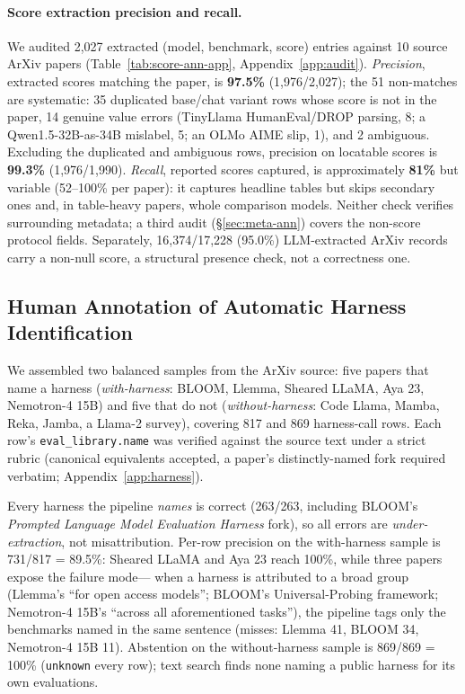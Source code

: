 \documentclass[11pt]{article}
\begin{document}
\paragraph{Score extraction precision and recall.}
We audited 2{,}027 extracted (model, benchmark, score) entries against 10 source
ArXiv papers (Table~\ref{tab:score-ann-app}, Appendix~\ref{app:audit}).
\emph{Precision}, extracted scores matching the paper, is \textbf{97.5\%}
(1{,}976/2{,}027); the 51 non-matches are systematic: 35 duplicated base/chat variant
rows whose score is not in the paper, 14 genuine value errors (TinyLlama
HumanEval/DROP parsing, 8; a Qwen1.5-32B-as-34B mislabel, 5; an OLMo AIME slip, 1),
and 2 ambiguous. Excluding the duplicated and ambiguous rows, precision on locatable
scores is \textbf{99.3\%} (1{,}976/1{,}990). \emph{Recall},
reported scores captured, is approximately \textbf{81\%} but variable (52--100\%
per paper): it captures headline tables but skips secondary ones and, in
table-heavy papers, whole comparison models. Neither check verifies surrounding
metadata; a third audit (\S\ref{sec:meta-ann}) covers the non-score protocol fields.
Separately, 16{,}374/17{,}228 (95.0\%) LLM-extracted ArXiv records carry a non-null
score, a structural presence check, not a correctness one.

\subsection{Human Annotation of Automatic Harness Identification}
\label{sec:harness-ann}
We assembled two balanced samples from the ArXiv source: five papers that name a
harness (\emph{with-harness}: BLOOM, Llemma, Sheared LLaMA, Aya 23, Nemotron-4
15B) and five that do not (\emph{without-harness}: Code Llama, Mamba, Reka, Jamba,
a Llama-2 survey), covering 817 and 869 harness-call rows. Each row's
\texttt{eval\_library.name} was verified against the source text under a strict
rubric (canonical equivalents accepted, a paper's distinctly-named fork required
verbatim; Appendix~\ref{app:harness}).

Every harness the pipeline \emph{names} is correct (263/263, including BLOOM's
\emph{Prompted Language Model Evaluation Harness} fork), so all errors are
\emph{under-extraction}, not misattribution. Per-row precision on the with-harness sample is 731/817 = 89.5\%:
Sheared LLaMA and Aya 23 reach 100\%, while three papers expose the failure mode---%
when a harness is attributed to a broad group (Llemma's ``for open access models'';
BLOOM's Universal-Probing framework; Nemotron-4 15B's ``across all aforementioned
tasks''), the pipeline tags only the benchmarks named in the same sentence (misses:
Llemma 41, BLOOM 34, Nemotron-4 15B 11). Abstention on the without-harness sample is
869/869 = 100\% (\texttt{unknown} every row); text search
finds none naming a public harness for its own evaluations.
\end{document}
